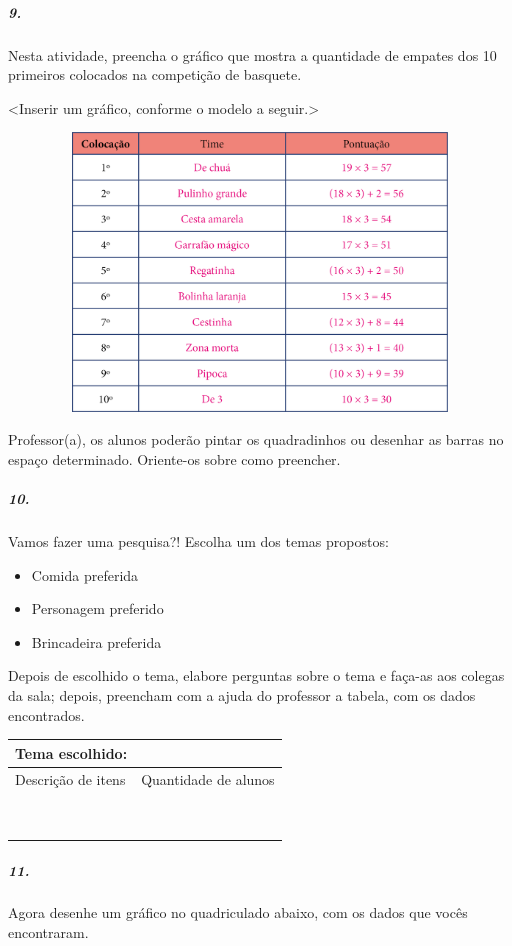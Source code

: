 \subparagraph{9.}\label{section-84}

Nesta atividade, preencha o gráfico que mostra a quantidade de empates
dos 10 primeiros colocados na competição de basquete.

\textless{}Inserir um gráfico, conforme o modelo a seguir.\textgreater{}

\includegraphics[width=6.20833in,height=2.91016in]{media/image95.png}

Professor(a), os alunos poderão pintar os quadradinhos ou desenhar as barras no espaço determinado. Oriente-os sobre como preencher.

\subparagraph{10. }\label{section-85}

Vamos fazer uma pesquisa?! Escolha um dos temas propostos:

\begin{itemize}
\item
  Comida preferida
\item
  Personagem preferido
\item
  Brincadeira preferida
\end{itemize}

Depois de escolhido o tema, elabore perguntas sobre o tema e faça-as aos colegas da sala; depois,
preencham com a ajuda do professor a tabela, com os dados encontrados.

\begin{longtable}[]{@{}ll@{}}
\toprule
Tema escolhido:\tabularnewline
\midrule
\endhead
Descrição de itens & Quantidade de alunos\tabularnewline
&\tabularnewline
&\tabularnewline
&\tabularnewline
&\tabularnewline
&\tabularnewline
&\tabularnewline
&\tabularnewline
&\tabularnewline
&\tabularnewline
\bottomrule
\end{longtable}


\subparagraph{11. }\label{section-85}
Agora desenhe um gráfico no quadriculado abaixo, com os dados que vocês
encontraram.

